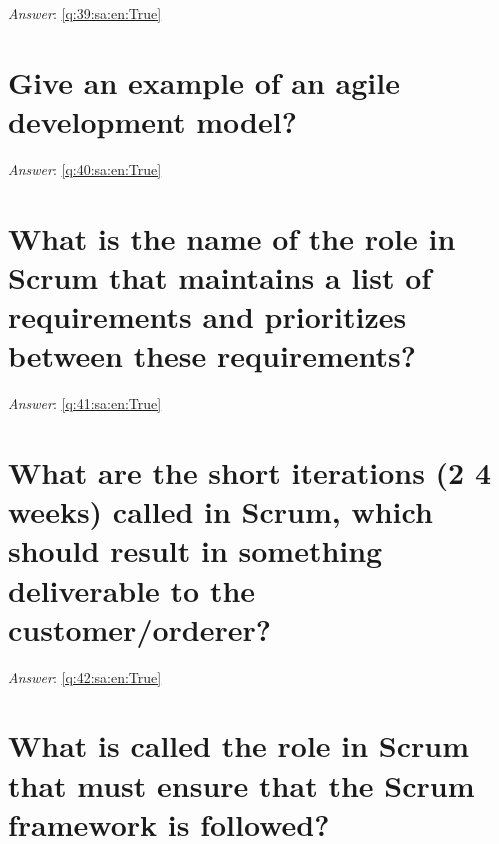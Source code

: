 \documentclass[a4paper,11pt,oneside]{book}
\begin{document}
\begin{sloppypar}
\textit{Answer}: \autoref{q:39:sa:en:True}



\section{Give an example of an agile development model?}

\label{q:40:sa:en:False}

\vspace{2cm}

\noindent\makebox[\textwidth]{\hrulefill}

\vspace{1cm}

\textit{Answer}: \autoref{q:40:sa:en:True}



\section{What is the name of the role in Scrum that maintains a list of requirements and prioritizes between these requirements?}

\label{q:41:sa:en:False}

\vspace{2cm}

\noindent\makebox[\textwidth]{\hrulefill}

\vspace{1cm}

\textit{Answer}: \autoref{q:41:sa:en:True}



\section{What are the short iterations (2 {\textendash} 4 weeks) called in Scrum, which should result in something deliverable to the customer/orderer?}

\label{q:42:sa:en:False}

\vspace{2cm}

\noindent\makebox[\textwidth]{\hrulefill}

\vspace{1cm}

\textit{Answer}: \autoref{q:42:sa:en:True}



\section{What is called the role in Scrum that must ensure that the Scrum framework is followed?}


\end{sloppypar}
\end{document}
